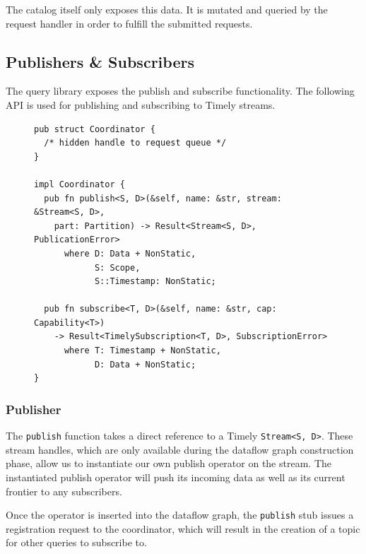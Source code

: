 The catalog itself only exposes this data. It is mutated and queried by the
request handler in order to fulfill the submitted requests.


\clearpage
\subsection{Publishers \& Subscribers} \label{sec:pubsubimpl}

The query library exposes the publish and subscribe functionality. The following
API is used for publishing and subscribing to Timely streams.

\begin{figure}[htb]
\begin{lstlisting}[caption={[Publish \& subscribe interface]
The interface for publishing and subscribing Timely streams.
The \lstinline{NonStatic} bounds on the data and timestamp
parameters are required for safe serialization described in \ref{sec:serialization}.
}]
pub struct Coordinator {
  /* hidden handle to request queue */
}

impl Coordinator {
  pub fn publish<S, D>(&self, name: &str, stream: &Stream<S, D>,
    part: Partition) -> Result<Stream<S, D>, PublicationError>
      where D: Data + NonStatic, 
            S: Scope,
            S::Timestamp: NonStatic;

  pub fn subscribe<T, D>(&self, name: &str, cap: Capability<T>) 
    -> Result<TimelySubscription<T, D>, SubscriptionError>
      where T: Timestamp + NonStatic, 
            D: Data + NonStatic;
}
\end{lstlisting}
\end{figure}

\subsubsection{Publisher}

The \lstinline{publish} function takes a direct reference to a Timely
\lstinline{Stream<S, D>}. These stream handles, which are only available during
the dataflow graph construction phase, allow us to instantiate our own publish
operator on the stream.  The instantiated publish operator will push its
incoming data as well as its current frontier to any subscribers. 

Once the operator is inserted into the dataflow graph, the \lstinline{publish}
stub issues a registration request to the coordinator, which will result in the
creation of a topic for other queries to subscribe to.

